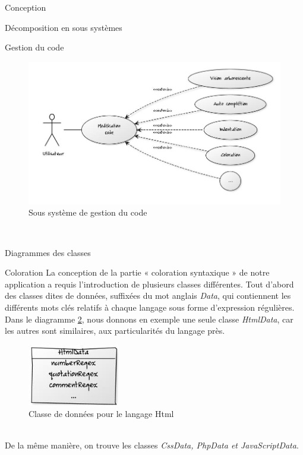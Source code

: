 \documentclass[a4paper, 12pt]{report}
\begin{document}
\begin{part}{Conception}
\begin{chapter}{Décomposition en sous systèmes}
\begin{section}{Gestion du code}
\begin{figure}[ht]
\begin{center}
						\includegraphics[width=13cm]{images/gestionCode.jpg}
						\caption{Sous système de gestion du code}
						\label{saphir}
					\end{center}
				\end{figure}~\\
			\end{section}
		\end{chapter}
		\begin{chapter}{Diagrammes des classes}
			\begin{section}{Coloration}
				La conception de la partie « coloration syntaxique » de notre application a requis l'introduction de plusieurs classes différentes.
				Tout d'abord des classes dites de données, suffixées du mot anglais \emph{Data}, qui contiennent les différents mots clés relatifs
				à chaque langage sous forme d'\glspl{expression régulière}.\\
				Dans le diagramme \ref{blouson}, nous donnons en exemple une seule classe \emph{HtmlData}, car les autres sont similaires,
				aux particularités du langage près.
				\begin{figure}[ht]
					\begin{center}
						\includegraphics[width=4cm]{images/classesColorationData.jpg}
						\caption{Classe de données pour le langage Html}
						\label{blouson}
					\end{center}
				\end{figure}~\\
				De la même manière, on trouve les classes \emph{CssData, PhpData et JavaScriptData}.\\



\end{section}
\end{chapter}
\end{part}
\end{document}
